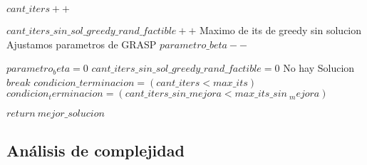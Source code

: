\begin{algorithmic}[1]
	        	    	
	        	\EndIf
	
	        	\State $cant\_iters++$
	    	
	    	    	\Else
	    	    	\State $cant\_iters\_sin\_sol\_greedy\_rand\_factible++$
	    	    		\Comment Maximo de its de greedy sin solucion
	    	    	            	\Comment Ajustamos parametros de GRASP
	    	    	                \State $parametro\_beta--$
	    	    	            \EndIf
	
	        	    	\State $parametro_beta = 0$
	        		\EndIf
	        		\State $cant\_iters\_sin\_sol\_greedy\_rand\_factible = 0$
	        	\EndIf
        	\EndIf
        \Else
        \Comment No hay Solucion
        	\State $break$
        \EndIf	
           \State $condicion\_terminacion = (cant\_iters < max\_its)$            
            \State $condicion_terminacion = (cant\_iters\_sin\_mejora < max\_its\_sin\ _mejora)$
        \EndIf

       \EndWhile

       \State $return\:  mejor\_solucion$

\EndProcedure
\end{algorithmic}


\subsection{An\'alisis de complejidad}

